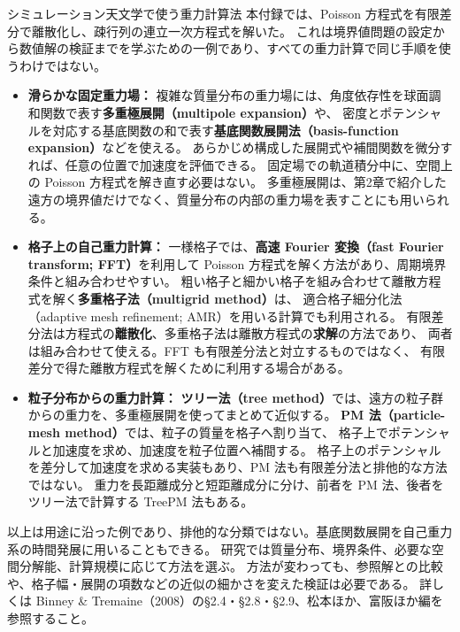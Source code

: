 \begin{topicblock}{シミュレーション天文学で使う重力計算法}
本付録では、Poisson 方程式を有限差分で離散化し、疎行列の連立一次方程式を解いた。
これは境界値問題の設定から数値解の検証までを学ぶための一例であり、すべての重力計算で同じ手順を使うわけではない。

\begin{itemize}
\item \textbf{滑らかな固定重力場：}
複雑な質量分布の重力場には、角度依存性を球面調和関数で表す\textbf{多重極展開（multipole expansion）}や、
密度とポテンシャルを対応する基底関数の和で表す\textbf{基底関数展開法（basis-function expansion）}などを使える。
あらかじめ構成した展開式や補間関数を微分すれば、任意の位置で加速度を評価できる。
固定場での軌道積分中に、空間上の Poisson 方程式を解き直す必要はない。
多重極展開は、第2章で紹介した遠方の境界値だけでなく、質量分布の内部の重力場を表すことにも用いられる。

\item \textbf{格子上の自己重力計算：}
一様格子では、\textbf{高速 Fourier 変換（fast Fourier transform; FFT）}を利用して
Poisson 方程式を解く方法があり、周期境界条件と組み合わせやすい。
粗い格子と細かい格子を組み合わせて離散方程式を解く\textbf{多重格子法（multigrid method）}は、
適合格子細分化法（adaptive mesh refinement; AMR）を用いる計算でも利用される。
有限差分法は方程式の\textbf{離散化}、多重格子法は離散方程式の\textbf{求解}の方法であり、
両者は組み合わせて使える。FFT も有限差分法と対立するものではなく、
有限差分で得た離散方程式を解くために利用する場合がある。

\item \textbf{粒子分布からの重力計算：}
\textbf{ツリー法（tree method）}では、遠方の粒子群からの重力を、多重極展開を使ってまとめて近似する。
\textbf{PM 法（particle-mesh method）}では、粒子の質量を格子へ割り当て、
格子上でポテンシャルと加速度を求め、加速度を粒子位置へ補間する。
格子上のポテンシャルを差分して加速度を求める実装もあり、PM 法も有限差分法と排他的な方法ではない。
重力を長距離成分と短距離成分に分け、前者を PM 法、後者をツリー法で計算する TreePM 法もある。
\end{itemize}

以上は用途に沿った例であり、排他的な分類ではない。基底関数展開を自己重力系の時間発展に用いることもできる。
研究では質量分布、境界条件、必要な空間分解能、計算規模に応じて方法を選ぶ。
方法が変わっても、参照解との比較や、格子幅・展開の項数などの近似の細かさを変えた検証は必要である。
詳しくは Binney \& Tremaine（2008）の§2.4・§2.8・§2.9\cite{bt2008}、松本ほか\cite{matsumoto}、富阪ほか編\cite{tomisaka2007}を参照すること。
\end{topicblock}


